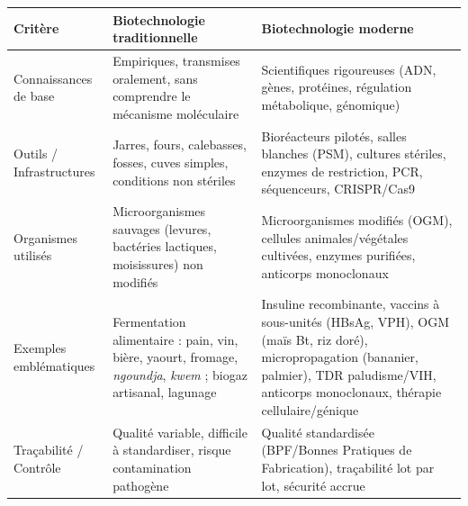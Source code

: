 \documentclass[11pt]{article}
\begin{document}
\begin{center}
\begin{tabularx}{\linewidth}{|l|X|X|}\hline
\rowcolor{popblueL} \textbf{Critère} & \textbf{Biotechnologie traditionnelle} & \textbf{Biotechnologie moderne} \\ \hline
Connaissances de base & Empiriques, transmises oralement, sans comprendre le mécanisme moléculaire & Scientifiques rigoureuses (ADN, gènes, protéines, régulation métabolique, génomique) \\ \hline
Outils / Infrastructures & Jarres, fours, calebasses, fosses, cuves simples, conditions non stériles & Bioréacteurs pilotés, salles blanches (PSM), cultures stériles, enzymes de restriction, PCR, séquenceurs, CRISPR/Cas9 \\ \hline
Organismes utilisés & Microorganismes sauvages (levures, bactéries lactiques, moisissures) non modifiés & Microorganismes modifiés (OGM), cellules animales/végétales cultivées, enzymes purifiées, anticorps monoclonaux \\ \hline
Exemples emblématiques & Fermentation alimentaire : pain, vin, bière, yaourt, fromage, \emph{ngoundja}, \emph{kwem} ; biogaz artisanal, lagunage & Insuline recombinante, vaccins à sous-unités (HBsAg, VPH), OGM (maïs Bt, riz doré), micropropagation (bananier, palmier), TDR paludisme/VIH, anticorps monoclonaux, thérapie cellulaire/génique \\ \hline
Traçabilité / Contrôle & Qualité variable, difficile à standardiser, risque contamination pathogène & Qualité standardisée (BPF/Bonnes Pratiques de Fabrication), traçabilité lot par lot, sécurité accrue \\ \hline
\end{tabularx}
\end{center}
\end{document}
